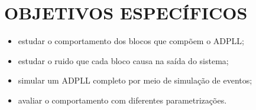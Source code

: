 \section{OBJETIVOS ESPECÍFICOS}
\begin{itemize}
	\item estudar o comportamento dos blocos que compõem o ADPLL;
	\item estudar o ruido que cada bloco causa na saída do sistema;
	\item simular um ADPLL completo por meio de simulação de eventos;
	\item avaliar o comportamento com diferentes parametrizações.
\end{itemize}










